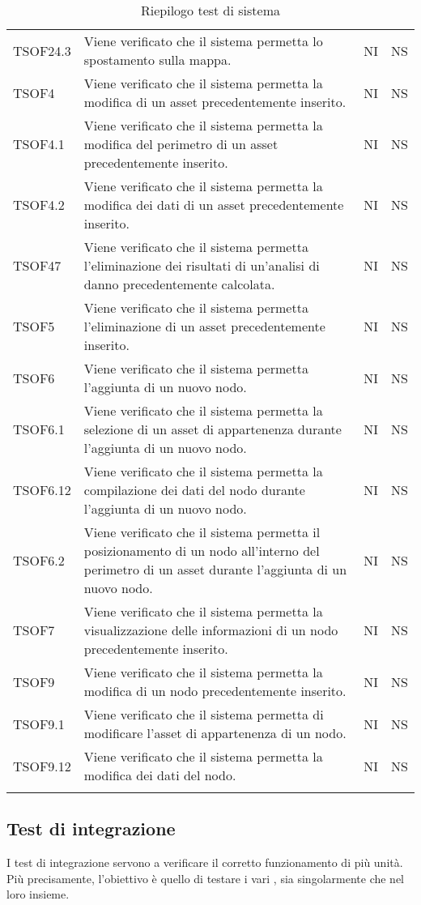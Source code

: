 \begin{longtable}{p{1.5cm}!{\VRule[1pt]}p{5cm}!{\VRule[1pt]}p{1cm}!{\VRule[1pt]}p{1cm}}
			TSOF24.3 & Viene verificato che il sistema permetta lo spostamento sulla mappa. & NI & NS \\ 
			TSOF4 & Viene verificato che il sistema permetta la modifica di un asset precedentemente inserito. & NI & NS \\ 
			TSOF4.1 & Viene verificato che il sistema permetta la modifica del perimetro di un asset precedentemente inserito. & NI & NS \\ 
			TSOF4.2 & Viene verificato che il sistema permetta la modifica dei dati di un asset precedentemente inserito. & NI & NS \\ 
			TSOF47 & Viene verificato che il sistema permetta l'eliminazione dei risultati di un'analisi di danno precedentemente calcolata. & NI & NS \\ 
			TSOF5 & Viene verificato che il sistema permetta l'eliminazione di un asset precedentemente inserito. & NI & NS \\ 
			TSOF6 & Viene verificato che il sistema permetta l'aggiunta di un nuovo nodo. & NI & NS \\ 
			TSOF6.1 & Viene verificato che il sistema permetta la selezione di un asset di appartenenza durante l'aggiunta di un nuovo nodo. & NI & NS \\ 
			TSOF6.12 & Viene verificato che il sistema permetta la compilazione dei dati del nodo durante l'aggiunta di un nuovo nodo. & NI & NS \\ 
			TSOF6.2 & Viene verificato che il sistema permetta il posizionamento di un nodo all'interno del perimetro di un asset durante l'aggiunta di un nuovo nodo. & NI & NS \\ 
			TSOF7 & Viene verificato che il sistema permetta la visualizzazione delle informazioni di un nodo precedentemente inserito. & NI & NS \\ 
			TSOF9 & Viene verificato che il sistema permetta la modifica di un nodo precedentemente inserito. & NI & NS \\ 
			TSOF9.1 & Viene verificato che il sistema permetta di modificare l'asset di appartenenza di un nodo. & NI & NS \\ 
			TSOF9.12 & Viene verificato che il sistema permetta la modifica dei dati del nodo. & NI & NS \\ 
			\caption{Riepilogo test di sistema}
		\end{longtable}
		
	\subsection{Test di integrazione}
		I test di integrazione servono a verificare il corretto funzionamento di più unità. Più precisamente, l'obiettivo è quello di testare i vari , sia singolarmente che nel loro insieme.
		
